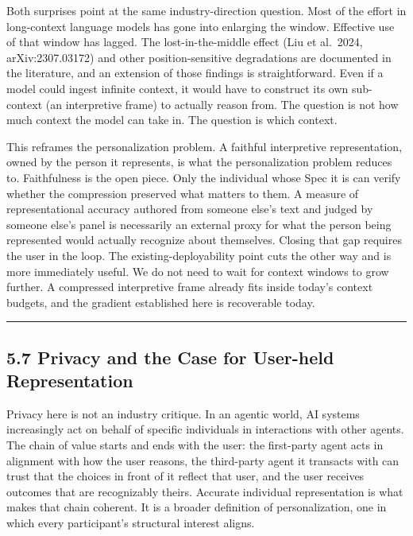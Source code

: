 Both surprises point at the same industry-direction question. Most of
the effort in long-context language models has gone into enlarging the
window. Effective use of that window has lagged. The lost-in-the-middle
effect (Liu et al.~2024, arXiv:2307.03172) and other position-sensitive
degradations are documented in the literature, and an extension of those
findings is straightforward. Even if a model could ingest infinite
context, it would have to construct its own sub-context (an interpretive
frame) to actually reason from. The question is not how much context the
model can take in. The question is which context.

This reframes the personalization problem. A faithful interpretive
representation, owned by the person it represents, is what the
personalization problem reduces to. Faithfulness is the open piece. Only
the individual whose Spec it is can verify whether the compression
preserved what matters to them. A measure of representational accuracy
authored from someone else's text and judged by someone else's panel is
necessarily an external proxy for what the person being represented
would actually recognize about themselves. Closing that gap requires the
user in the loop. The existing-deployability point cuts the other way
and is more immediately useful. We do not need to wait for context
windows to grow further. A compressed interpretive frame already fits
inside today's context budgets, and the gradient established here is
recoverable today.

\begin{center}\rule{0.5\linewidth}{0.5pt}\end{center}

\hypertarget{privacy-and-the-case-for-user-held-representation}{%
\subsection{5.7 Privacy and the Case for User-held
Representation}\label{privacy-and-the-case-for-user-held-representation}}

Privacy here is not an industry critique. In an agentic world, AI
systems increasingly act on behalf of specific individuals in
interactions with other agents. The chain of value starts and ends with
the user: the first-party agent acts in alignment with how the user
reasons, the third-party agent it transacts with can trust that the
choices in front of it reflect that user, and the user receives outcomes
that are recognizably theirs. Accurate individual representation is what
makes that chain coherent. It is a broader definition of personalization,
one in which every participant's structural interest aligns.

